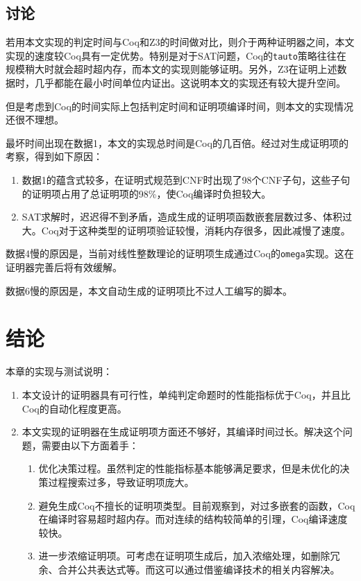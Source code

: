 \subsection{讨论}
若用本文实现的判定时间与Coq和Z3的时间做对比，则介于两种证明器之间，本文实现的速度较Coq具有一定优势。特别是对于SAT问题，Coq的\texttt{tauto}策略往往在规模稍大时就会超时超内存，而本文的实现则能够证明。另外，Z3在证明上述数据时，几乎都能在最小时间单位内证出。这说明本文的实现还有较大提升空间。

但是考虑到Coq的时间实际上包括判定时间和证明项编译时间，则本文的实现情况还很不理想。

最坏时间出现在数据1，本文的实现总时间是Coq的几百倍。经过对生成证明项的考察，得到如下原因：
\begin{enumerate}
  \item 数据1的蕴含式较多，在证明式规范到CNF时出现了98个CNF子句，这些子句的证明项占用了总证明项的98\%，使Coq编译时负担较大。
  \item SAT求解时，迟迟得不到矛盾，造成生成的证明项函数嵌套层数过多、体积过大。Coq对于这种类型的证明项验证较慢，消耗内存很多，因此减慢了速度。
\end{enumerate}

数据4慢的原因是，当前对线性整数理论的证明项生成通过Coq的\texttt{omega}实现。这在证明器完善后将有效缓解。

数据6慢的原因是，本文自动生成的证明项比不过人工编写的脚本。

\section{结论}
本章的实现与测试说明：
\begin{enumerate}
  \item 本文设计的证明器具有可行性，单纯判定命题时的性能指标优于Coq，并且比Coq的自动化程度更高。
  \item 本文实现的证明器在生成证明项方面还不够好，其编译时间过长。解决这个问题，需要由以下方面着手：
    \begin{enumerate}
      \item 优化决策过程。虽然判定的性能指标基本能够满足要求，但是未优化的决策过程搜索过多，导致证明项庞大。
      \item 避免生成Coq不擅长的证明项类型。目前观察到，对过多嵌套的函数，Coq在编译时容易超时超内存。而对连续的结构较简单的引理，Coq编译速度较快。
      \item 进一步浓缩证明项。可考虑在证明项生成后，加入浓缩处理，如删除冗余、合并公共表达式等。而这可以通过借鉴编译技术的相关内容解决。
    \end{enumerate}
\end{enumerate}
